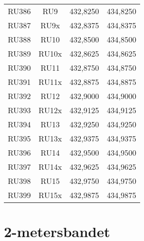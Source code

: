 \begin{tabular}{ r | c | l | l }
	RU386 & RU9   & 432,8250       & 434,8250       \\
	RU387 & RU9x  & 432,8375       & 434,8375       \\
	RU388 & RU10  & 432,8500       & 434,8500       \\
	RU389 & RU10x & 432,8625       & 434,8625       \\
	RU390 & RU11  & 432,8750       & 434,8750       \\
	RU391 & RU11x & 432,8875       & 434,8875       \\
	RU392 & RU12  & 432,9000       & 434,9000       \\
	RU393 & RU12x & 432,9125       & 434,9125       \\
	RU394 & RU13  & 432,9250       & 434,9250       \\
	RU395 & RU13x & 432,9375       & 434,9375       \\
	RU396 & RU14  & 432,9500       & 434,9500       \\
	RU397 & RU14x & 432,9625       & 434,9625       \\
	RU398 & RU15  & 432,9750       & 434,9750       \\
	RU399 & RU15x & 432,9875       & 434,9875       \\
\end{tabular}

\newpage

\section{2-metersbandet}

